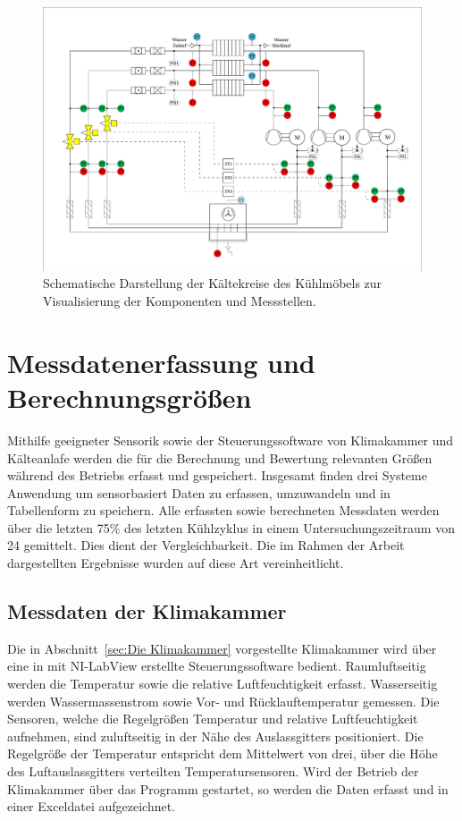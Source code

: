 \begin{figure} %
\centering
\includegraphics[scale=.56,angle=90]{Pictures/IDC150.pdf}
\caption{Schematische Darstellung der Kältekreise des Kühlmöbels zur Visualisierung der Komponenten und Messstellen.}
\label{fig:IDC150}
\end{figure}

\clearpage

\section{Messdatenerfassung und Berechnungsgrößen}
\label{sec:Erfassung von Messdaten}

Mithilfe geeigneter Sensorik sowie der Steuerungssoftware von Klimakammer und Kälteanlafe werden die für die Berechnung und Bewertung relevanten Größen während des Betriebs erfasst und gespeichert. Insgesamt finden drei Systeme Anwendung um sensorbasiert Daten zu erfassen, umzuwandeln und in Tabellenform zu speichern. Alle erfassten sowie berechneten Messdaten werden über die letzten \unit{75}{\%} des letzten Kühlzyklus in einem Untersuchungszeitraum von \unit{24}{\hour} gemittelt. Dies dient der Vergleichbarkeit. Die im Rahmen der Arbeit dargestellten Ergebnisse wurden auf diese Art vereinheitlicht.




\subsection{Messdaten der Klimakammer}
\label{subsec:Messdaten der Klimakammer}

Die in Abschnitt~\ref{sec:Die Klimakammer} vorgestellte Klimakammer wird über eine in mit NI-LabView erstellte Steuerungssoftware bedient. Raumluftseitig werden die Temperatur sowie die relative Luftfeuchtigkeit erfasst. Wasserseitig werden Wassermassenstrom sowie Vor- und Rücklauftemperatur gemessen. 
Die Sensoren, welche die Regelgrößen Temperatur und relative Luftfeuchtigkeit aufnehmen, sind zuluftseitig in der Nähe des Auslassgitters positioniert. Die Regelgröße der Temperatur entspricht dem Mittelwert von drei, über die Höhe des Luftauslassgitters verteilten Temperatursensoren. Wird der Betrieb der Klimakammer über das Programm gestartet, so werden die Daten erfasst und in einer Exceldatei aufgezeichnet.

